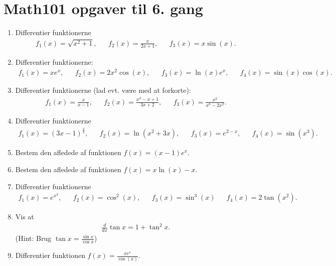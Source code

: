 \newpage
\section{Math101 opgaver til 6. gang}
\begin{enumerate}

	\item Differentier funktionerne
	\begin{align*}
	f_1(x)=\sqrt{x^2+1},&& f_2(x)=\frac{x}{2x+1},&& f_3(x)=x\sin(x).
	\end{align*}

	\item Differentier funktionerne:
	\begin{align*}
	f_1(x)=xe^x,&& f_2(x)=2x^2\cos(x),&& f_3(x)=\ln(x)e^x,&& f_4(x)=\sin(x)\cos(x).
	\end{align*}

	\item Differentier funktionerne (lad evt. være med at forkorte):
	\begin{align*}
	f_1(x)=\frac{x}{x-1},&&f_2(x)=\frac{x^2-x+1}{3x+2},&&f_3(x)=\frac{x^2}{x^3-2x^2}.
	\end{align*}
	
	\item Differentier funktionerne
	\begin{align*}
	f_1(x)=(3x-1)^\frac{4}{3},&& f_2(x)=\ln(x^2+3x),&& f_3(x)=e^{2-x},&&f_4(x)=\sin(x^3).
	\end{align*}
	
	\item \label{it:diff24} Bestem den afledede af funktionen $f(x)=(x-1)e^x$.
	
	
	\item \label{it:diff23}Bestem den afledede af funktionen $f(x)=x\ln(x)-x$.
	
	\item Differentier funktionerne 
	\begin{align*}
	f_1(x)=e^{x^3},&&f_2(x)=\cos^2(x),&&f_3(x)=\sin^3(x)&&f_4(x)=2\tan(x^2).
	\end{align*}
		
	\item\label{it:diff21} Vis at 
	\begin{align*}
	\frac{d}{dx} \tan x= 1+\tan^2x.
	\end{align*}
	(Hint: Brug $\tan x=\frac{\sin x}{\cos x}$)

	\item Differentier funktionen $f(x)=\frac{xe^x}{\cos(x)}$.
		

\end{enumerate}
